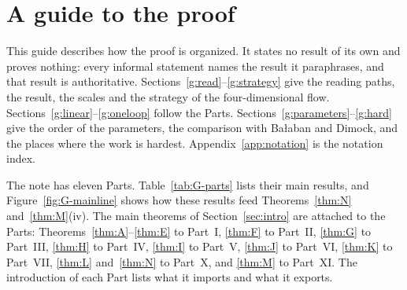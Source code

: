 \part*{A guide to the proof}
\label{guide}

This guide describes how the proof is organized. It states no result of its own and proves nothing: every informal statement names the result it paraphrases, and that result is authoritative. Sections~\ref{g:read}--\ref{g:strategy} give the reading paths, the result, the scales and the strategy of the four-dimensional flow. Sections~\ref{g:linear}--\ref{g:oneloop} follow the Parts. Sections~\ref{g:parameters}--\ref{g:hard} give the order of the parameters, the comparison with Ba\l aban and Dimock, and the places where the work is hardest. Appendix~\ref{app:notation} is the notation index.

\label{g:read}



The note has eleven Parts. Table~\ref{tab:G-parts} lists their main results, and Figure~\ref{fig:G-mainline} shows how these results feed Theorems~\ref{thm:N} and~\ref{thm:M}(iv). The main theorems of Section~\ref{sec:intro} are attached to the Parts: Theorems~\ref{thm:A}--\ref{thm:E} to Part~I, \ref{thm:F} to Part~II, \ref{thm:G} to Part~III, \ref{thm:H} to Part~IV, \ref{thm:I} to Part~V, \ref{thm:J} to Part~VI, \ref{thm:K} to Part~VII, \ref{thm:L} and~\ref{thm:N} to Part~X, and \ref{thm:M} to Part~XI. The introduction of each Part lists what it imports and what it exports.

